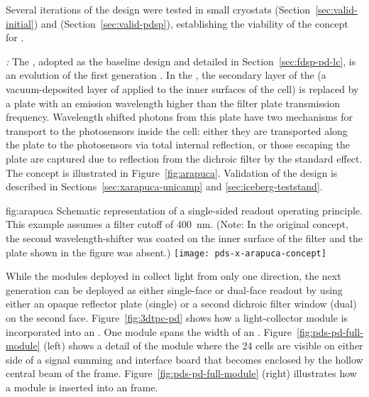 Several iterations of the  design were tested in small cryostats (Section~\ref{sec:valid-initial}) and  (Section~\ref{sec:valid-pdsp}), establishing the viability of the concept for .

\textit{:} The , adopted as the baseline design and detailed in 
Section~\ref{sec:fdsp-pd-lc}, is an evolution of the first generation .  In the , the secondary  layer of the  (a vacuum-deposited layer of  applied to the inner surfaces of the cell) is replaced by a  plate with an emission wavelength higher than the filter plate transmission frequency.  Wavelength shifted photons from this plate have two mechanisms for transport to the photosensors inside the cell: either they are transported along the  plate to the photosensors via total internal reflection, or those escaping the plate are captured due to reflection from the dichroic filter by the standard  effect.
The concept is illustrated in Figure~\ref{fig:arapuca}.
Validation of the  design is described in Sections~\ref{sec:xarapuca-unicamp} and \ref{sec:iceberg-teststand}.

\begin{dunefigure}{fig:arapuca}
{Schematic representation of a single-sided readout   operating principle.  This example assumes a filter cutoff of \SI{400}{nm}. (Note: In the original  concept, the second wavelength-shifter was coated on the inner surface of the filter and the  plate shown in the figure was absent.)}               
\texttt{[image: pds-x-arapuca-concept]}   
\end{dunefigure}

While the  modules deployed in  collect light from only one direction, the next generation  can be deployed as either single-face or dual-face readout by using either an opaque reflector plate (single) or a second dichroic filter window (dual) on the second face. 
Figure~\ref{fig:3dtpc-pd} shows how a light-collector module is incorporated into an . One module spans the width of an . Figure~\ref{fig:pds-pd-full-module} (left) shows a detail of the module where the 24  cells are visible on either side of a signal summing and interface board that becomes enclosed by the hollow central beam of the  frame. Figure~\ref{fig:pds-pd-full-module} (right) illustrates how a module is inserted into an  frame.


